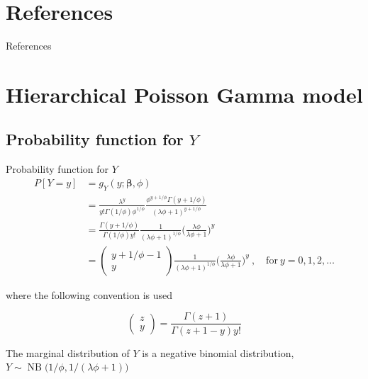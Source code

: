 \documentclass[aspectratio=169,handout]{beamer}
\DeclareMathOperator{\NB}{NB}
\begin{document}
\hypertarget{references}{%
\section{References}\label{references}}

\begin{frame}{References}
\printbibliography[heading=none]
\end{frame}

\hypertarget{hierarchical-poisson-gamma-model}{%
\section{Hierarchical Poisson Gamma
model}\label{hierarchical-poisson-gamma-model}}

\hypertarget{probability-function-for-y}{%
\subsection{\texorpdfstring{Probability function for
\(Y\)}{Probability function for Y}}\label{probability-function-for-y}}

\begin{frame}{Probability function for \(Y\)}
\begin{equation} \label{eq:pdfMix}
  \begin{aligned}
    P[Y=y]&=g_{Y}(y;\boldsymbol \beta, \phi) \\
    &=\frac{\lambda^{y}}{y!\Gamma(1/\phi)\phi^{1/\phi}}\frac{\phi^{y+1/\phi}\Gamma(y+1/\phi)}{(\lambda \phi + 1)^{y+1/\phi}} \\
    &=\frac{\Gamma(y+1/\phi)}{\Gamma(1/\phi)y!}\frac{1}{(\lambda\phi+1)^{1/\phi}}\bigg(\frac{\lambda\phi}{\lambda\phi+1}\bigg)^{y} \\
    &=\begin{pmatrix} y+1/\phi-1 \\ y \end{pmatrix} \frac{1}{(\lambda\phi+1)^{1/\phi}}\bigg(\frac{\lambda\phi}{\lambda\phi+1}\bigg)^{y} \ , \quad \mathrm{for} \ y = 0, 1, 2, \dots
  \end{aligned}
\end{equation}

where the following convention is used

\begin{equation}
  \begin{pmatrix} z\\y \end{pmatrix} = \frac{\Gamma(z+1)}{\Gamma(z+1-y)y!}
\end{equation}

The marginal distribution of \(Y\) is a negative binomial distribution,
\(Y\sim \NB\big(1/\phi,1/(\lambda \phi+1)\big)\)
\end{frame}
\end{document}
